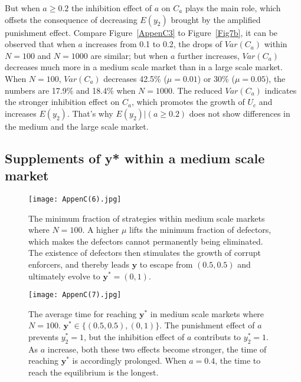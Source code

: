 \documentclass[letterpaper,10pt]{article}
\numberwithin{equation}{section}
\begin{document}
But when $ a \geq 0.2 $ the inhibition effect of $ a $ on $ C_{a} $ plays the main role, which offsets the consequence of decreasing $ E(y_{2}) $ brought by the amplified punishment effect. Compare Figure~\ref{AppenC3} to Figure~\ref{Fig7b}, it can be observed that when $ a $ increases from 0.1 to 0.2, the drops of $ Var(C_{a}) $ within $ N = 100 $ and $ N = 1000 $ are similar; but when $ a $ further increases, $ Var(C_{a}) $ decreases much more in a medium scale market than in a large scale market. When $ N = 100 $, $ Var(C_{a}) $ decreases 42.5\% ($ \mu = 0.01 $) or 30\% ($ \mu = 0.05 $), the numbers are 17.9\% and 18.4\% when $ N = 1000 $. The reduced $ Var(C_{a}) $ indicates the stronger inhibition effect on $C_{a} $, which promotes the growth of $ U_{c} $ and increases $ E(y_{2}) $. That's why $ E(y_{2})|(a \geq 0.2) $ does not show differences in the medium and the large scale market.

\subsection{Supplements of y* within a medium scale market}\label{AppendixC4}

\begin{figure}[H]
    \begin{center}
        \texttt{[image: AppenC(6).jpg]}
    \end{center}
    \caption{The minimum fraction of strategies within medium scale markets where $ N = 100 $. A higher $ \mu $ lifts the minimum fraction of defectors, which makes the defectors cannot permanently being eliminated. The existence of defectors then stimulates the growth of corrupt enforcers, and thereby leads $ \mathbf{y} $ to escape from $ (0.5, 0.5) $ and ultimately evolve to $ \mathbf{y}^*=(0,1) $.}
    \label{AppenC4}
\end{figure}
    
\begin{figure}[H]
    \begin{center}
        \texttt{[image: AppenC(7).jpg]}
    \end{center}
    \caption{The average time for reaching $ \mathbf{y}^* $ in medium scale markets where $ N = 100 $. $ \mathbf{y}^* \in \{(0.5, 0.5), (0, 1) \}$. The punishment effect of $ a $ prevents $ y_{2}^* = 1 $, but the inhibition effect of $ a $ contributs to $ y_{2}^* = 1 $. As $ a $ increase, both these two effects become stronger, the time of reaching $ \mathbf{y}^* $ is accordingly prolonged. When $ a=0.4 $, the time to reach the equilibrium is the longest.}
    \label{AppenC5}
\end{figure}
\end{document}
